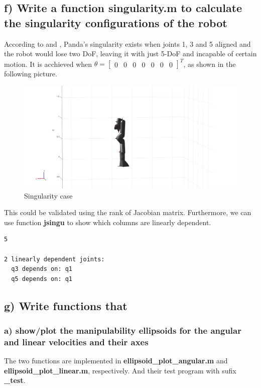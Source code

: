 \documentclass[english,10pt,a4paper]{article}
\begin{document}
    \subsection*{f) Write a function \textbf{singularity.m} to calculate the singularity configurations of the robot}
    According to \cite{Hepanda} and \cite{Tittelpanda}, Panda's singularity exists when joints 1, 3 and 5 aligned and the robot would lose two DoF, leaving it with just 5-DoF and incapable of certain motion. It is acchieved when $\theta = \begin{bmatrix}
        0 & 0 & 0 & 0 & 0 & 0 & 0
    \end{bmatrix}^T$, as shown in the following picture. 
    \begin{figure}[H]
        \centering
        \includegraphics[width=\linewidth]{singularity.png}
        \caption{Singularity case}
        \label{fig:enter-label}
    \end{figure}
    This could be validated using the rank of Jacobian matrix. Furthermore, we can use function \textbf{jsingu} to show which columns are linearly dependent.
    \begin{lstlisting}[style=matlab]
         5

2 linearly dependent joints:
  q3 depends on: q1 
  q5 depends on: q1 
    \end{lstlisting}

    \subsection*{g) Write functions that }
    \subsubsection*{a) show/plot the manipulability ellipsoids for the angular and linear velocities and their axes}
    The two functions are implemented in \textbf{ellipsoid\_plot\_angular.m} and \textbf{ellipsoid\_plot\_linear.m}, respectively. And their test program with sufix \textbf{\_test}.
    
\end{document}
